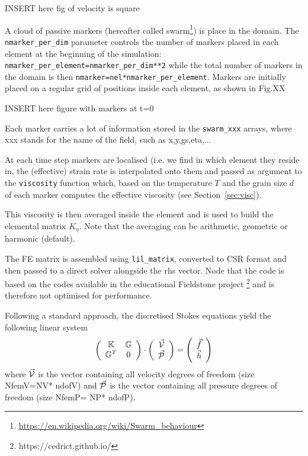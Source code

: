 \documentclass[a4paper]{article}
\newcommand{\K}{{\mathbb{K}}}
\newcommand{\G}{{\mathbb{G}}}
\begin{document}
\begin{center}
INSERT here fig of velocity is square
\end{center}

A cloud of passive markers (hereafter called swarm\footnote{\url{https://en.wikipedia.org/wiki/Swarm_behaviour}}) is 
place in the domain. 
The \lstinline{nmarker_per_dim} parameter controls the number of
markers placed in each element at the beginning of the simulation:
\lstinline{nmarker_per_element=nmarker_per_dim**2}
while the total number of markers in the domain is then 
\lstinline{nmarker=nel*nmarker_per_element}.
Markers are initially placed on a regular grid of positions inside each element, as shown in 
Fig.XX

\begin{center}
INSERT here figure with markers at t=0
\end{center}

Each marker carries a lot of information stored in the \lstinline{swarm_xxx}
arrays, where xxx stands for the name of the field, such as x,y,gs,eta,... 

At each time step markers are localised (i.e. we find in which element they reside
in, the (effective) strain rate is interpolated onto them and passed as 
argument to the \lstinline{viscosity} function which, based on the 
temperature $T$ and the grain size $d$ of each marker computes the 
effective viscosity (see Section~\ref{sec:visc}).

This viscosity is then averaged inside the element and is used to build
the elemental matrix $K_\eta$. Note that the averaging can be arithmetic,
geometric or harmonic (default).

The FE matrix is assembled using \lstinline{lil_matrix},
converted to CSR format and then passed to a direct solver alongside the rhs vector.
Node that the code is based on the codes available in the educational Fieldstone project
\footnote{https://cedrict.github.io/}
and is therefore not optimised for performance.


Following a standard approach, the discretised Stokes equations yield
the following linear system
\[
\left(
\begin{array}{cc}
\K & \G \\
\G^T & 0 
\end{array}
\right)
\cdot
\left(
\begin{array}{c}
\vec{\cal V} \\ 
\vec{\cal P}
\end{array}
\right)
=
\left(
\begin{array}{c}
\vec{f} \\ 
\vec{h}
\end{array}
\right)
\]
where $\vec{\cal V}$ is the vector containing all velocity degrees of 
freedom (size { NfemV}={NV}*{ ndofV})
and $\vec{\cal P}$ is the vector containing all pressure degrees of freedom 
(size { NfemP}={ NP}*{ ndofP}).
\end{document}

